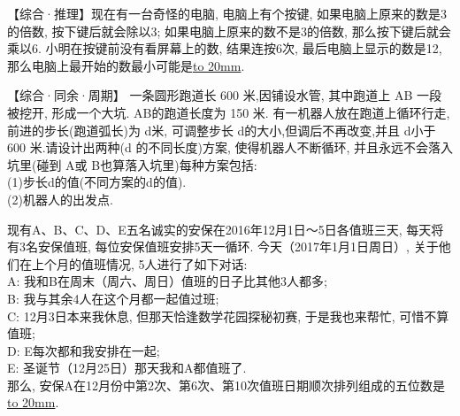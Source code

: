 \item {
    【综合·推理】现在有一台奇怪的电脑, 电脑上有个按键, 如果电脑上原来的数是3的倍数, 按下键后就会除以3; 如果电脑上原来的数不是3的倍数, 那么按下键后就会乘以6. 小明在按键前没有看屏幕上的数, 结果连按6次, 最后电脑上显示的数是12, 那么电脑上最开始的数最小可能是\underline{\hbox to 20mm{}}.
    \vspace{1cm}
}

\item {
    【综合·同余·周期】
    一条圆形跑道长 600 米,因铺设水管, 其中跑道上 AB 一段被挖开, 形成一个大坑. AB的跑道长度为 150 米.  有一机器人放在跑道上循环行走,  前进的步长(跑道弧长)为 d米, 可调整步长 d的大小,但调后不再改变,并且 d小于 600 米.请设计出两种(d 的不同长度)方案, 使得机器人不断循环, 并且永远不会落入坑里(碰到 A或 B也算落入坑里)每种方案包括:\\
    (1)步长d的值(不同方案的d的值). \\
    (2)机器人的出发点.
    \vspace{1cm}
}

\item {
    现有A、B、C、D、E五名诚实的安保在2016年12月1日～5日各值班三天, 每天将有3名安保值班, 每位安保值班安排5天一循环. 今天（2017年1月1日周日）, 关于他们在上个月的值班情况, 5人进行了如下对话: \\
    A: 我和B在周末（周六、周日）值班的日子比其他3人都多; \\
    B: 我与其余4人在这个月都一起值过班; \\
    C: 12月3日本来我休息, 但那天恰逢数学花园探秘初赛, 于是我也来帮忙, 可惜不算值班; \\
    D: E每次都和我安排在一起; \\
    E: 圣诞节（12月25日）那天我和A都值班了. \\
    那么, 安保A在12月份中第2次、第6次、第10次值班日期顺次排列组成的五位数是\underline{\hbox to 20mm{}}.
    \vspace{1cm}
}

